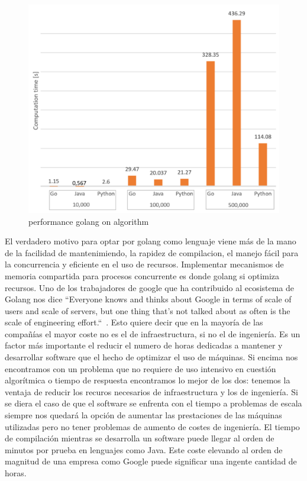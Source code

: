 \begin{figure}[H]
	\includegraphics[height=0.3\textheight]{./part/Proyecto_ejecutivo/memoria_constructiva/golang/img/compTime}
	\caption[performance golang on algorithm]{performance golang on algorithm\cite{Dymora20201}}\label{fig:performance golang}
\end{figure}

El verdadero motivo para optar por golang como lenguaje viene más de la mano de la facilidad de mantenimiendo, la rapidez de compilacion, el manejo fácil para la concurrencia y eficiente en el uso de recursos.
Implementar mecanismos de memoria compartida para procesos concurrente es donde golang si optimiza recursos.
Uno de los trabajadores de google que ha contribuido al ecosistema de Golang nos dice “Everyone knows and thinks about Google in terms of scale of users and scale of servers, but one thing that's not talked about as often is the scale of engineering effort.“~\cite{Meyerson2014104+101}.
Esto quiere decir que en la mayoría de las compañías el mayor coste no es el de infraestructura, si no el de ingeniería.
Es un factor más importante el reducir el numero de horas dedicadas a mantener y desarrollar software que el hecho de optimizar el uso de máquinas.
Si encima nos encontramos con un problema que no requiere de uso intensivo en cuestión algorítmica o tiempo de respuesta encontramos lo mejor de los dos: tenemos la ventaja de reducir los recuros necesarios de infraestructura y los de ingeniería.
Si se diera el caso de que el software se enfrenta con el tiempo a problemas de escala siempre nos quedará la opción de aumentar las prestaciones de las máquinas utilizadas pero no tener problemas de aumento de costes de ingeniería.
El tiempo de compilación mientras se desarrolla un software puede llegar al orden de minutos por prueba en lenguajes como Java.
Este coste elevando al orden de magnitud de una empresa como Google puede significar una ingente cantidad de horas.

